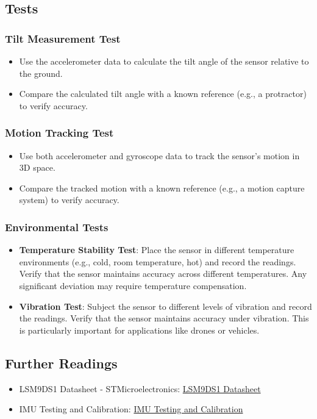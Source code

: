 \subsection{Tests}
\subsubsection{Tilt Measurement Test}
\begin{itemize}
	\item Use the accelerometer data to calculate the tilt angle of the sensor relative to the ground.
	\item Compare the calculated tilt angle with a known reference (e.g., a protractor) to verify accuracy.
\end{itemize}

\subsubsection{Motion Tracking Test}
\begin{itemize}
	\item Use both accelerometer and gyroscope data to track the sensor's motion in 3D space.
	\item Compare the tracked motion with a known reference (e.g., a motion capture system) to verify accuracy.
\end{itemize}

\subsubsection{Environmental Tests}
\begin{itemize}
	\item \textbf{Temperature Stability Test}:  
	Place the sensor in different temperature environments (e.g., cold, room temperature, hot) and record the readings. Verify that the sensor maintains accuracy across different temperatures. Any significant deviation may require temperature compensation.
	\item \textbf{Vibration Test}:  
	Subject the sensor to different levels of vibration and record the readings. Verify that the sensor maintains accuracy under vibration. This is particularly important for applications like drones or vehicles.
\end{itemize}

\subsection{Further Readings}
\begin{itemize}
	\item LSM9DS1 Datasheet - STMicroelectronics: \href{https://www.st.com/resource/en/datasheet/lsm9ds1.pdf}{LSM9DS1 Datasheet}
	\item IMU Testing and Calibration: \href{https://www.vectornav.com/resources/inertial-navigation-primer}{IMU Testing and Calibration}
\end{itemize}

